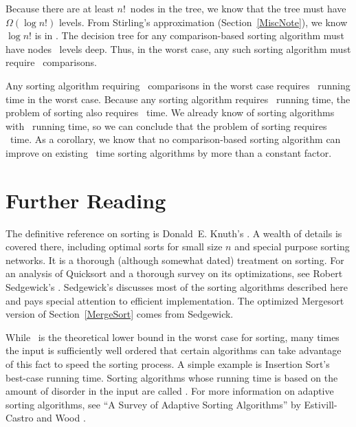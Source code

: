 Because there are at least \(n!\)~nodes in the tree, we know that the
tree must have \(\Omega(\log n!)\) levels.
From Stirling's
approximation (Section~\ref{MiscNote}), we know \(\log n!\) is
in \Omeganlogn.
The decision tree for any comparison-based sorting algorithm must
have nodes \Omeganlogn\ levels deep.
Thus, in the worst case, any such sorting algorithm must require
\Omeganlogn\ comparisons.

Any sorting algorithm requiring \Omeganlogn\ comparisons in the
worst case requires \Omeganlogn\ running time in the worst case.
Because any sorting algorithm requires \Omeganlogn\ running time,
the problem of sorting also requires \Omeganlogn\ time.
We already know of sorting algorithms with \Onlogn\ running
time, so we can conclude that the problem of sorting requires
\Thetanlogn\ time.
As a corollary, we know that no comparison-based sorting algorithm can
improve on existing \Thetanlogn\ time sorting algorithms by more than 
a constant factor.

\section{Further Reading}

The definitive reference on sorting is Donald~E. Knuth's
 \cite{KnuthV3}.
A wealth of details is covered there, including
optimal sorts for small size \(n\)
and special purpose sorting networks.
It is a thorough (although somewhat dated) treatment on sorting.
For an analysis of Quicksort and a thorough survey on its
optimizations, see Robert Sedgewick's  \cite{SedgeSort}.
Sedgewick's  \cite{Sedgewick} discusses most of the
sorting algorithms described here and pays special attention to
efficient implementation.
The optimized Mergesort version of Section~\ref{MergeSort} comes from
Sedgewick.

While \Omeganlogn\ is the theoretical lower bound in the worst case for
sorting,
many times the input is sufficiently well ordered that
certain algorithms can take advantage of this fact to speed the
sorting process.
A simple example is Insertion Sort's best-case running time.
Sorting algorithms whose running time is based on the amount of
disorder in the input are called
.
For more information on adaptive sorting algorithms, see
``A Survey of Adaptive Sorting Algorithms'' by Estivill-Castro and
Wood \cite{AdSort}.


